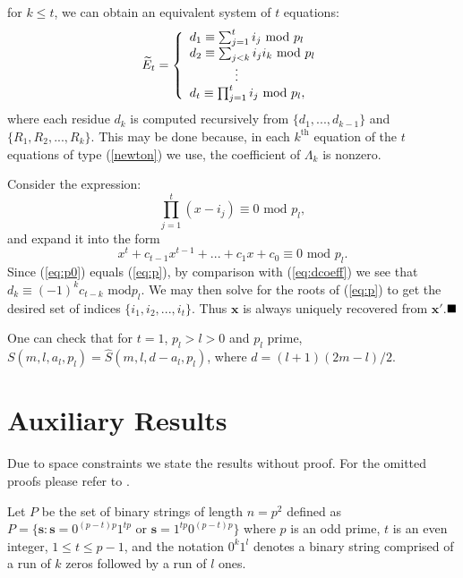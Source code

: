 for $k \leq t$, we can obtain an equivalent system of $t$
equations:
\begin{equation} \label{eq:dcoeff}
\widetilde{E}_t=\left\{
\begin{array}{ll}
d_1 \equiv \sum_{j=1}^t i_j \text{ mod }p_l\\
d_2 \equiv \sum_{j<k} i_j i_k\text{ mod }p_l\\
\hspace{0.5in}\vdots \\
d_t \equiv \prod_{j=1}^t i_j \text{ mod }p_l,
\end{array} \right.
\end{equation}
where each residue $d_k$ is computed recursively from
$\{d_1,...,d_{k-1}\}$ and $\{R_1,R_2,...,R_k\}$. This may be done
because, in each $k^{\text{th}}$ equation of the $t$ equations of
type (\ref{newton}) we use, the coefficient of $\Lambda_k$ is
nonzero.

Consider the expression:\vspace{-0.1in}
\begin{equation}\label{eq:p0} \prod_{j=1}^t(x-i_j)\equiv 0 \text{ mod } p_l,
\end{equation}
and expand it into the form
\vspace{-0.1in}\begin{equation}\label{eq:p}
x^t+c_{t-1}x^{t-1}+...+c_1x+c_0 \equiv 0 \text{ mod } p_l.
\end{equation}
Since (\ref{eq:p0}) equals (\ref{eq:p}), by comparison with
(\ref{eq:dcoeff}) we see that $d_k \equiv (-1)^kc_{t-k} \text{ mod
} p_l$. We may then solve for the roots of (\ref{eq:p}) to get the
desired set of indices $\{i_1,i_2,...,i_t\}$. Thus $\mathbf{x}$ is
always uniquely recovered from $\mathbf{x'}$.$\hfill\blacksquare$

One can check that for $t=1$, $p_l>l>0$ and $p_l$
prime, $S(m,l,a_l,p_l)=\hat{S}(m,l,d-a_l,p_l)$, where $d=(l+1)(2m-l)/2$.%

\section{Auxiliary Results}\label{aux}
Due to space constraints we state the results without proof. For
the omitted proofs please refer to \cite{techArray:06}.

Let $P$ be the set of binary strings of length $n=p^2$ defined as
$P=\{\mathbf{s} : \mathbf{s}=0^{(p-t)p}1^{tp}$ or
$\mathbf{s}=1^{tp}0^{(p-t)p} \}$ where $p$ is an odd prime, $t$ is
an even integer, $1 \leq t \leq p-1$, and the notation $0^k1^l$
denotes a binary string comprised of a run of $k$ zeros followed
by a run of $l$ ones.

